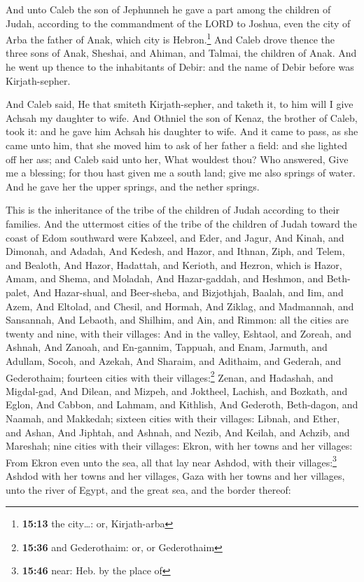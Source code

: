  And unto Caleb the son of Jephunneh he gave a part among
the children of Judah, according to the commandment of the LORD to
Joshua, even the city of Arba the father of Anak, which city is
Hebron.\footnote{\textbf{15:13} the city\ldots: or, Kirjath-arba}
 And Caleb drove thence the three sons of Anak, Sheshai,
and Ahiman, and Talmai, the children of Anak.  And he
went up thence to the inhabitants of Debir: and the name of Debir before
was Kirjath-sepher.

 And Caleb said, He that smiteth Kirjath-sepher, and
taketh it, to him will I give Achsah my daughter to wife.
 And Othniel the son of Kenaz, the brother of Caleb, took
it: and he gave him Achsah his daughter to wife.  And it
came to pass, as she came unto him, that she moved him to ask of her
father a field: and she lighted off her ass; and Caleb said unto her,
What wouldest thou?  Who answered, Give me a blessing;
for thou hast given me a south land; give me also springs of water. And
he gave her the upper springs, and the nether springs.

 This is the inheritance of the tribe of the children of
Judah according to their families.  And the uttermost
cities of the tribe of the children of Judah toward the coast of Edom
southward were Kabzeel, and Eder, and Jagur,  And Kinah,
and Dimonah, and Adadah,  And Kedesh, and Hazor, and
Ithnan,  Ziph, and Telem, and Bealoth, 
And Hazor, Hadattah, and Kerioth, and Hezron, which is Hazor,
 Amam, and Shema, and Moladah,  And
Hazar-gaddah, and Heshmon, and Beth-palet,  And
Hazar-shual, and Beer-sheba, and Bizjothjah,  Baalah, and
Iim, and Azem,  And Eltolad, and Chesil, and Hormah,
 And Ziklag, and Madmannah, and Sansannah,
 And Lebaoth, and Shilhim, and Ain, and Rimmon: all the
cities are twenty and nine, with their villages:  And in
the valley, Eshtaol, and Zoreah, and Ashnah,  And Zanoah,
and En-gannim, Tappuah, and Enam,  Jarmuth, and Adullam,
Socoh, and Azekah,  And Sharaim, and Adithaim, and
Gederah, and Gederothaim; fourteen cities with their
villages:\footnote{\textbf{15:36} and Gederothaim: or, or Gederothaim}
 Zenan, and Hadashah, and Migdal-gad,  And
Dilean, and Mizpeh, and Joktheel,  Lachish, and Bozkath,
and Eglon,  And Cabbon, and Lahmam, and Kithlish,
 And Gederoth, Beth-dagon, and Naamah, and Makkedah;
sixteen cities with their villages:  Libnah, and Ether,
and Ashan,  And Jiphtah, and Ashnah, and Nezib,
 And Keilah, and Achzib, and Mareshah; nine cities with
their villages:  Ekron, with her towns and her villages:
 From Ekron even unto the sea, all that lay near Ashdod,
with their villages:\footnote{\textbf{15:46} near: Heb. by the place of}
 Ashdod with her towns and her villages, Gaza with her
towns and her villages, unto the river of Egypt, and the great sea, and
the border thereof:

